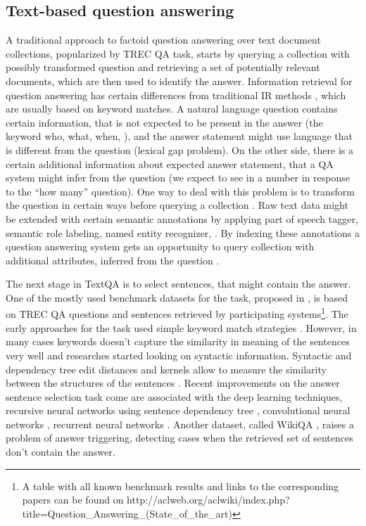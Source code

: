 \subsection{Text-based question answering}
\label{sec:rel_work:factoid:text}

A traditional approach to factoid question answering over text document collections, popularized by TREC QA task, starts by querying a collection with possibly transformed question and retrieving a set of potentially relevant documents, which are then used to identify the answer.
Information retrieval for question answering has certain differences from traditional IR methods \cite{keikha2014retrieving}, which are usually based on keyword matches.
A natural language question contains certain information, that is not expected to be present in the answer (\eg the keyword who, what, when, \etc), and the answer statement might use language that is different from the question (lexical gap problem).
On the other side, there is a certain additional information about expected answer statement, that a QA system might infer from the question (\eg we expect to see in a number in response to the ``how many'' question).
One way to deal with this problem is to transform the question in certain ways before querying a collection \cite{AgichteinLG01,brill_askmsr}.
Raw text data might be extended with certain semantic annotations by applying part of speech tagger, semantic role labeling, named entity recognizer, \etc.
By indexing these annotations a question answering system gets an opportunity to query collection with additional attributes, inferred from the question \cite{bilotti2007structured,yao2013automatic}.

The next stage in TextQA is to select sentences, that might contain the answer.
One of the mostly used benchmark datasets for the task, proposed in \cite{wang2007jeopardy}, is based on TREC QA questions and sentences retrieved by participating systems\footnote{A table with all known benchmark results and links to the corresponding papers can be found on http://aclweb.org/aclwiki/index.php?title=Question\_Answering\_(State\_of\_the\_art)}.
The early approaches for the task used simple keyword match strategies \cite{ittycheriah2001ibm,soubbotin2001patterns}.
However, in many cases keywords doesn't capture the similarity in meaning of the sentences very well and researches started looking on syntactic information.
Syntactic and dependency tree edit distances and kernels allow to measure the similarity between the structures of the sentences \cite{punyakanok2004mapping,shen2005exploring,heilman2010tree,yao2013answer,wang2010probabilistic}.
Recent improvements on the answer sentence selection task come are associated with the deep learning techniques, \eg recursive neural networks using sentence dependency tree \cite{iyyer2014neural}, convolutional neural networks \cite{yu2014deep,santos2016attentive}, recurrent neural networks \cite{tan2015lstm,WangN15}.
Another dataset, called WikiQA \cite{yang2015wikiqa}, raises a problem of answer triggering, \ie detecting cases when the retrieved set of sentences don't contain the answer.

